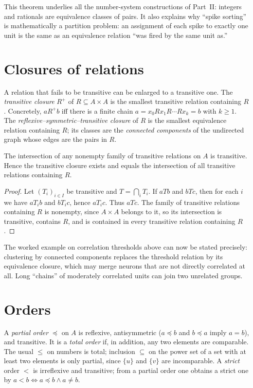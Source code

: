This theorem underlies all the number-system constructions of Part~II: integers and rationals are equivalence classes of pairs. It also explains why ``spike sorting'' is mathematically a partition problem: an assignment of each spike to exactly one unit is the same as an equivalence relation ``was fired by the same unit as.''

\section{Closures of relations}
A relation that fails to be transitive can be enlarged to a transitive one. The \emph{transitive closure} $R^+$ of $R\subseteq A\times A$ is the smallest transitive relation containing $R$. Concretely, $aR^+b$ iff there is a finite chain $a=x_0Rx_1R\cdots Rx_k=b$ with $k\ge1$. The \emph{reflexive--symmetric--transitive closure} of $R$ is the smallest equivalence relation containing $R$; its classes are the \emph{connected components} of the undirected graph whose edges are the pairs in $R$.

\begin{proposition}
The intersection of any nonempty family of transitive relations on $A$ is transitive. Hence the transitive closure exists and equals the intersection of all transitive relations containing $R$.
\end{proposition}
\begin{proof}
Let $(T_i)_{i\in I}$ be transitive and $T=\bigcap_iT_i$. If $aTb$ and $bTc$, then for each $i$ we have $aT_ib$ and $bT_ic$, hence $aT_ic$. Thus $aTc$. The family of transitive relations containing $R$ is nonempty, since $A\times A$ belongs to it, so its intersection is transitive, contains $R$, and is contained in every transitive relation containing $R$.
\end{proof}

The worked example on correlation thresholds above can now be stated precisely: clustering by connected components replaces the threshold relation by its equivalence closure, which may merge neurons that are not directly correlated at all. Long ``chains'' of moderately correlated units can join two unrelated groups.

\section{Orders}
A \emph{partial order} $\preceq$ on $A$ is reflexive, antisymmetric ($a\preceq b$ and $b\preceq a$ imply $a=b$), and transitive. It is a \emph{total order} if, in addition, any two elements are comparable. The usual $\le$ on numbers is total; inclusion $\subseteq$ on the power set of a set with at least two elements is only partial, since $\{u\}$ and $\{v\}$ are incomparable. A \emph{strict} order $<$ is irreflexive and transitive; from a partial order one obtains a strict one by $a<b\iff a\preceq b\land a\ne b$.

